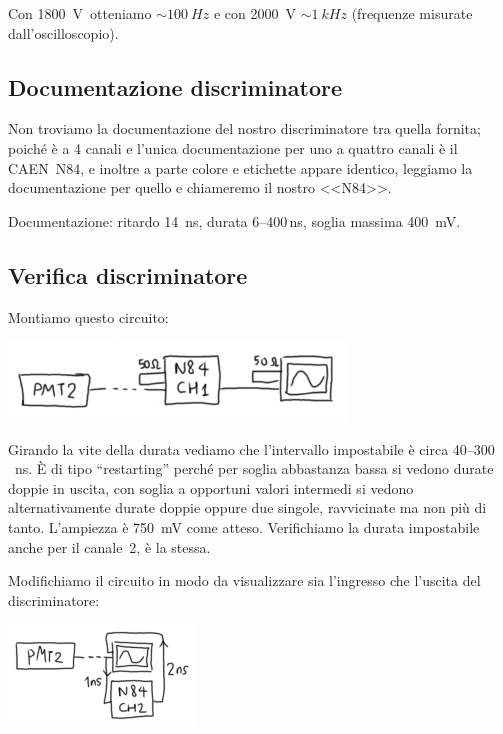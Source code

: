 \documentclass[a4paper]{article}
\begin{document}
Con \SI{1800}V otteniamo $\sim\SI{100}{Hz}$ e con \SI{2000}V $\sim\SI{1}{kHz}$
(frequenze misurate dall'oscilloscopio).


\subsection*{Documentazione discriminatore}

Non troviamo la documentazione del nostro discriminatore tra quella fornita;
poiché è a 4 canali e l'unica documentazione per uno a quattro canali è il CAEN~N84,
e inoltre a parte colore e etichette appare identico,
leggiamo la documentazione per quello e chiameremo il nostro <<N84>>.

Documentazione:
ritardo \SI{14}{ns},
durata 6--400\,\si{ns},
soglia massima \SI{400}{mV}.

\subsection*{Verifica discriminatore}

Montiamo questo circuito:

\includegraphics[width=9cm]{fig4a}

Girando la vite della durata vediamo che l'intervallo impostabile è circa 40--300\si{\,ns}.
È di tipo ``restarting'' perché per soglia abbastanza bassa si vedono durate doppie in uscita,
con soglia a opportuni valori intermedi si vedono alternativamente durate doppie oppure due singole, ravvicinate ma non più di tanto.
L'ampiezza è \SI{750}{mV} come atteso.
Verifichiamo la durata impostabile anche per il canale~2, è la stessa.

Modifichiamo il circuito in modo da visualizzare sia l'ingresso che l'uscita del discriminatore:

\includegraphics[width=5cm]{fig4b}
\end{document}
